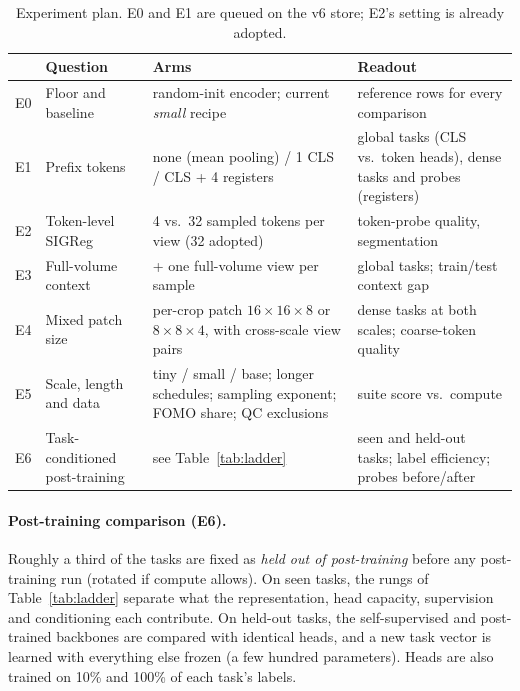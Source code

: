 \documentclass[10pt]{article}
\begin{document}
\begin{table}[h]
\centering\footnotesize
\begin{tabular}{@{}L{0.6cm} L{3.4cm} L{5.4cm} L{5.6cm}@{}}
\toprule
& Question & Arms & Readout \\
\midrule
E0 & Floor and baseline & random-init encoder; current \emph{small} recipe & reference rows for every comparison \\
E1 & Prefix tokens & none (mean pooling) / 1 CLS / CLS + 4 registers & global tasks (CLS vs.\ token heads), dense tasks and probes (registers) \\
E2 & Token-level SIGReg & 4 vs.\ 32 sampled tokens per view (32 adopted) & token-probe quality, segmentation \\
E3 & Full-volume context & + one full-volume view per sample & global tasks; train/test context gap \\
E4 & Mixed patch size & per-crop patch $16\times16\times8$ or $8\times8\times4$, with cross-scale view pairs & dense tasks at both scales; coarse-token quality \\
E5 & Scale, length and data & tiny / small / base; longer schedules; sampling exponent; FOMO share; QC exclusions & suite score vs.\ compute \\
E6 & Task-conditioned post-training & see Table~\ref{tab:ladder} & seen and held-out tasks; label efficiency; probes before/after \\
\bottomrule
\end{tabular}
\caption{Experiment plan. E0 and E1 are queued on the v6 store; E2's setting is already adopted.}
\label{tab:exp}
\end{table}

\paragraph{Post-training comparison (E6).} Roughly a third of the tasks are fixed as \emph{held out of
post-training} before any post-training run (rotated if compute allows). On seen tasks, the rungs of
Table~\ref{tab:ladder} separate what the representation, head capacity, supervision and conditioning each
contribute. On held-out tasks, the self-supervised and post-trained backbones are compared with identical heads, and
a new task vector is learned with everything else frozen (a few hundred parameters). Heads are also trained on 10\%
and 100\% of each task's labels.
\end{document}
